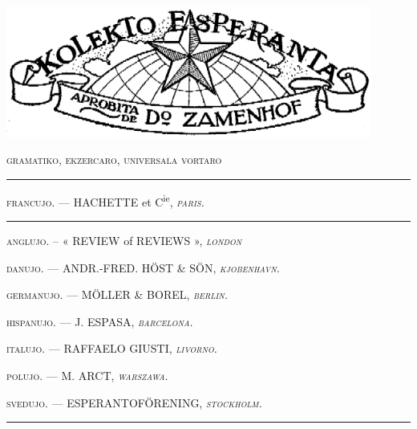 %
%
\begin{titlepage}

\begin{center}
\includegraphics[width=0.9\textwidth, angle=0]{../graphics/terglobo.png}\\[1em]

{}
\smallrule{}

\parbox{0.9\textwidth}{}

\vspace*{\fill}

{\csfont\textsc{gramatiko, ekzercaro, universala vortaro}}

\vspace*{\fill}

\rule{0.4\textwidth}{0.4pt}

\vspace*{\fill}


{\csfont \footnotesize

\textsc{francujo.} — HACHETTE et C\textsuperscript{ie}, \textsc{\textit{paris.}}

\rule[0.9ex]{13mm}{0.4pt}

\textsc{anglujo.} – « REVIEW of REVIEWS », \textsc{\textit{london}}

\textsc{danujo.} — ANDR.-FRED. HÖST \& SÖN, \textsc{\textit{kjobenhavn.}}

\textsc{germanujo.} — MÖLLER \& BOREL, \textsc{\textit{berlin.}}

\textsc{hispanujo.} — J. ESPASA, \textsc{\textit{barcelona.}}

\textsc{italujo.} — RAFFAELO GIUSTI, \textsc{\textit{livorno.}}

\textsc{polujo.} — M. ARCT, \textsc{\textit{warszawa.}}

\textsc{svedujo.} — ESPERANTOFÖRENING, \textsc{\textit{stockholm.}}
}

\rule{5mm}{0.4pt}


\end{center}

\end{titlepage}
